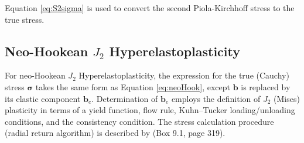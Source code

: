 \documentclass[sn-mathphys,Numbered]{sn-jnl}%
\newcommand{\bb}{\boldsymbol}
\begin{document}
\begin{appendices}
Equation \ref{eq:S2sigma} is used to convert the second Piola-Kirchhoff stress to the true stress.

\subsection{Neo-Hookean $J_2$ Hyperelastoplasticity}
For neo-Hookean $J_2$ Hyperelastoplasticity, the expression for the true (Cauchy) stress $\bb{\sigma}$ takes the same form as Equation \ref{eq:neoHook}, except $\boldsymbol{b}$ is replaced by its elastic component $\boldsymbol{b}_e$.
Determination of $\boldsymbol{b}_e$ employs the definition of $J_2$ (Mises) plasticity in terms of a yield function, flow rule, Kuhn–Tucker loading/unloading conditions, and the consistency condition.
The stress calculation procedure (radial return algorithm) is described by \citet{Simo1998} (Box 9.1, page 319).


\end{appendices}
\end{document}
